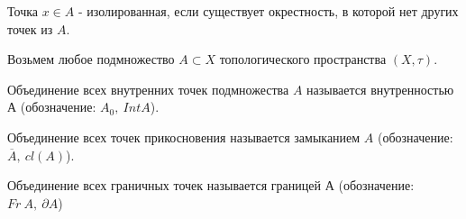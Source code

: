 \begin{definition}
Точка $x\in A$ - изолированная, если существует окрестность, в которой нет других точек из $A$. 
\end{definition}
Возьмем любое подмножество $A{\subset}X$ топологического пространства $(X,\tau)$.
\begin{definition}
Объединение всех внутренних точек подмножества $A$ называется внутренностью А (обозначение: $A_0,~ Int A$).
\end{definition}
\begin{definition}
Объединение всех точек прикосновения называется замыканием $A$ (обозначение: $\overline{A},~cl(A)$).
\end{definition}
\begin{definition}
Объединение всех граничных точек называется границей $А$ (обозначение: $Fr\ A,~\partial A$)
\end{definition}
